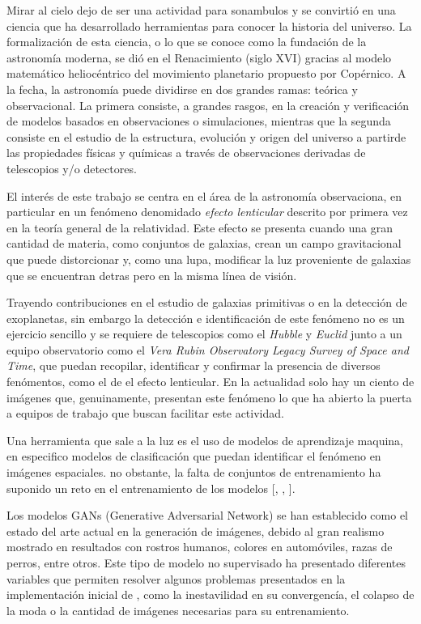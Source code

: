 \documentclass[letterpaper,12pt,oneside]{book}
\begin{document}
            Mirar al cielo dejo de ser una actividad para sonambulos y se convirtió en una ciencia que ha desarrollado herramientas para conocer la historia del universo. La formalización de esta ciencia, o lo que se conoce como la fundación de la astronomía moderna, se dió en el Renacimiento (siglo XVI) gracias al modelo matemático heliocéntrico del movimiento planetario propuesto por Copérnico. A la fecha, la astronomía puede dividirse en dos grandes ramas: teórica y observacional. La primera consiste, a grandes rasgos, en la creación y verificación de modelos basados en observaciones o simulaciones, mientras que la segunda consiste en el estudio de la estructura, evolución y origen del universo a partirde las propiedades físicas y químicas a través de observaciones derivadas de telescopios y/o detectores.

            El interés de este trabajo se centra en el área de la astronomía observaciona, en particular en un fenómeno denomidado {\it efecto lenticular} descrito por primera vez en la teoría general de la relatividad. Este efecto se presenta  cuando una gran cantidad de materia, como conjuntos de galaxias, crean un campo gravitacional que puede distorcionar y, como una lupa, modificar la luz proveniente de galaxias que se encuentran detras pero en la misma línea de visión. 
            
            Trayendo contribuciones en el estudio de galaxias primitivas o en la detección de exoplanetas, sin embargo la detección e identificación de este fenómeno no es un ejercicio sencillo y se requiere de telescopios como el {\it Hubble} y {\it Euclid} junto a un equipo observatorio como el {\it Vera Rubin Observatory Legacy Survey of Space and Time}, que puedan recopilar, identificar y confirmar la presencia de diversos fenómentos, como el de el efecto lenticular. En la actualidad solo hay un ciento de imágenes que, genuinamente, presentan este fenómeno lo que ha abierto la puerta a equipos de trabajo que buscan facilitar este actividad. 

            Una herramienta que sale a la luz es el uso de modelos de aprendizaje maquina, en especifico modelos de clasificación que puedan identificar el fenómeno en imágenes espaciales. no obstante, la falta de conjuntos de entrenamiento ha suponido un reto en el entrenamiento de los modelos [\cite{madireddy2019modular}, \cite{wilde2022detecting}, \cite{tran2022agel}].

            Los modelos GANs (Generative Adversarial Network) se han establecido como el estado del arte actual en la generación de imágenes, debido al gran realismo mostrado en resultados con rostros humanos, colores en automóviles, razas de perros, entre otros. Este tipo de modelo no supervisado ha presentado diferentes variables que permiten resolver algunos problemas presentados en la implementación inicial de \cite{goodfellow2020generative}, como la inestavilidad en su convergencía, el colapso de la moda o la cantidad de imágenes necesarias para su entrenamiento. 
            
\end{document}
